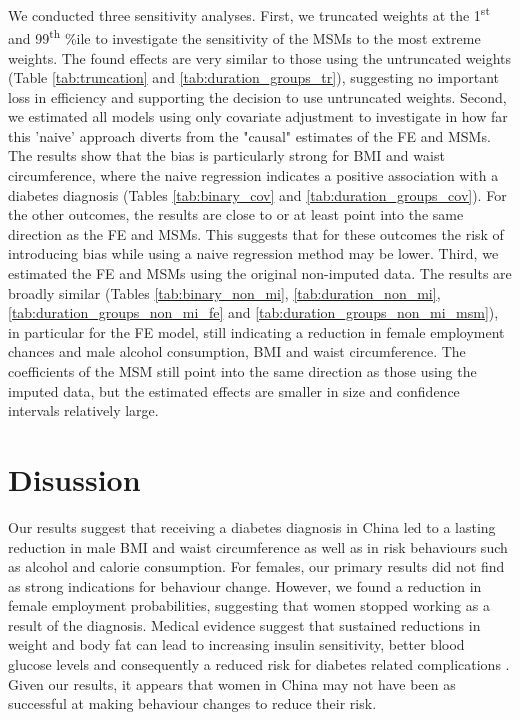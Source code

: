 We conducted three sensitivity analyses. First, we truncated weights at the 1\textsuperscript{st} and 99\textsuperscript{th} \%ile to investigate the sensitivity of the \acp{MSM} to the most extreme weights. The found effects are very similar to those using the untruncated weights (Table \ref{tab:truncation} and \ref{tab:duration_groups_tr}), suggesting no important loss in efficiency and supporting the decision to use untruncated weights. Second, we estimated all models using only covariate adjustment to investigate in how far this 'naive' approach diverts from the "causal" estimates of the \ac{FE} and \acp{MSM}. The results show that the bias is particularly strong for \ac{BMI} and waist circumference, where the naive regression indicates a positive association with a diabetes diagnosis (Tables \ref{tab:binary_cov} and \ref{tab:duration_groups_cov}). For the other outcomes, the results are close to or at least point into the same direction as the \ac{FE} and \acp{MSM}. This suggests that for these outcomes the risk of introducing bias while using a naive regression method may be lower. Third, we estimated the \ac{FE} and \acp{MSM} using the original non-imputed data. The results are broadly similar (Tables \ref{tab:binary_non_mi}, \ref{tab:duration_non_mi}, \ref{tab:duration_groups_non_mi_fe} and \ref{tab:duration_groups_non_mi_msm}), in particular for the \ac{FE} model, still indicating a reduction in female employment chances and male alcohol consumption, \ac{BMI} and waist circumference. The coefficients of the \ac{MSM} still point into the same direction as those using the imputed data, but the estimated effects are smaller in size and confidence intervals relatively large.


\FloatBarrier


\section{\label{sec:Discussion5}Disussion}

Our results suggest that receiving a diabetes diagnosis in China led to a lasting reduction in male \ac{BMI} and waist circumference as well as in risk behaviours such as alcohol and calorie consumption. For females, our primary results did not find as strong indications for behaviour change. However, we found a reduction in female employment probabilities, suggesting that women stopped working as a result of the diagnosis.
Medical evidence suggest that sustained reductions in weight and body fat can lead to increasing insulin sensitivity, better blood glucose levels and consequently a reduced risk for diabetes related complications \parencite{Long2014,Zhou2016}. Given our results, it appears that women in China may not have been as successful at making behaviour changes to reduce their risk.

